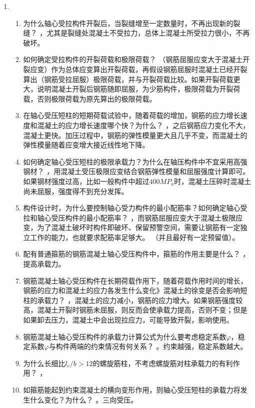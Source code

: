 \documentclass{article}
\begin{document}
\begin{enumerate}
\begin{enumerate}[1.]
          \end{enumerate}
    \item \begin{enumerate}[1.]
              \item 为什么轴心受拉构件开裂后，当裂缝增至一定数量时，不再出现新的裂缝？
                    ，尤其是裂缝处混凝土不受拉力，总体上混凝土所受拉力很小，不再破坏。
              \item 如何确定受拉构件的开裂荷载和极限荷载？
                    （钢筋屈服应变大于混凝土开裂应变）作为总体应变算出开裂荷载，再假设钢筋屈服时混凝土已经开裂算出（钢筋受拉屈服）极限荷载，并与开裂荷载比较。如果开裂荷载更大，说明混凝土开裂后钢筋随即屈服，为少筋构件，极限荷载为开裂荷载，否则极限荷载为原先算出的极限荷载。
              \item 在轴心受压短柱的短期荷载试验中，随着荷载的增加，钢筋的应力增长速度和混凝土的应力增长速度哪个快？为什么？
                    ，之后钢筋应力变化不大，混凝土更快。加压过程中，钢筋的弹性模量更大且几乎不变，而混凝土的弹性模量随着应变增大接近线性地下降。
              \item 如何确定轴心受压短柱的极限承载力？为什么在轴压构件中不宜采用高强钢材？
                    ，用混凝土受压极限应变结合钢筋弹性模量和屈服强度计算即可。如果钢材强度过高，比如一般构件中超过$400MP_a$时，混凝土压碎时混凝土尚未屈服，强度得不到充分发挥。
              \item 构件设计时，为什么要控制轴心受力构件的最小配筋率？如何确定轴心受拉和轴心受压构件的最小配筋率？
                    ，而钢筋屈服应变大于混凝土极限应变，为了混凝土破坏时构件即破坏、保留预警空间，需要让钢筋有一定独立工作的能力，也就要求配筋率足够大。
                    （并且最好有一定预留值）。
              \item 配有普通箍筋的钢筋混凝土轴心受压构件中，箍筋的作用主要是什么？
                    ，提高承载力。
              \item 钢筋混凝土轴心受压构件在长期荷载作用下，随着荷载作用时间的增长，钢筋的应力和混凝土的应力各发生什么变化》混凝土的徐变是否会影响短柱的承载力？
                    ，混凝土的应力减小，钢筋的应力增大。如果钢筋强度较高，混凝土开裂时钢筋未屈服，则反而会使承载力提高，否则不变；但是如果卸去压力，混凝土中会出现拉应力，可能导致开裂，影响使用。
              \item 钢筋混凝土轴心受压构件的承载力计算公式为什么要考虑稳定系数$\varphi$，稳定系数$\varphi$与构件两端的约束情况有何关系？
                    。约束越强，稳定系数越大。
              \item 为什么长细比$l_c/b>12$的螺旋筋柱，不考虑螺旋筋对柱承载力的有利作用？
                    ，
              \item 如箍筋能起到约束混凝土的横向变形作用，则轴心受压短柱的承载力将发生什么变化？为什么？
                    。三向受压。
          \end{enumerate}
\end{enumerate}
\end{document}
